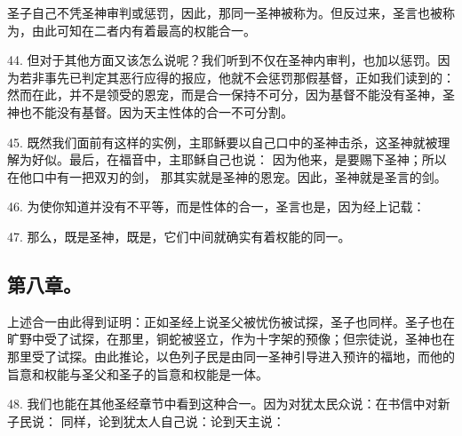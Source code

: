 圣子自己不凭圣神审判或惩罚，因此，那同一圣神被称为。但反过来，圣言也被称为，由此可知在二者内有着最高的权能合一。\par

44. 但对于其他方面又该怎么说呢？我们听到不仅在圣神内审判，也加以惩罚。因为若非事先已判定其恶行应得的报应，他就不会惩罚那假基督，正如我们读到的： 然而在此，并不是领受的恩宠，而是合一保持不可分，因为基督不能没有圣神，圣神也不能没有基督。因为天主性体的合一不可分割。\par

45. 既然我们面前有这样的实例，主耶稣要以自己口中的圣神击杀，这圣神就被理解为好似。最后，在福音中，主耶稣自己也说： 因为他来，是要赐下圣神；所以在他口中有一把双刃的剑， 那其实就是圣神的恩宠。因此，圣神就是圣言的剑。\par

46. 为使你知道并没有不平等，而是性体的合一，圣言也是，因为经上记载：\par

47. 那么，既是圣神，既是，它们中间就确实有着权能的同一。\par


\subsection{第八章。}

上述合一由此得到证明：正如圣经上说圣父被忧伤被试探，圣子也同样。圣子也在旷野中受了试探，在那里，铜蛇被竖立，作为十字架的预像；但宗徒说，圣神也在那里受了试探。由此推论，以色列子民是由同一圣神引导进入预许的福地，而他的旨意和权能与圣父和圣子的旨意和权能是一体。\par

48. 我们也能在其他圣经章节中看到这种合一。因为对犹太民众说：在书信中对新子民说： 同样，论到犹太人自己说：论到天主说：\par

